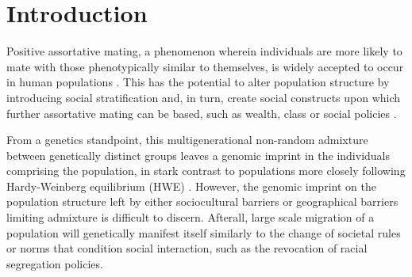 \documentclass[11pt]{article}
\begin{document}
\newpage
\tableofcontents
\thispagestyle{empty}

\newpage
\linenumbers


\setcounter{page}{3}
\section{Introduction}





Positive assortative mating, a phenomenon wherein individuals are more likely to mate with those phenotypically similar to themselves, is widely accepted to occur in human populations \parencite{Norris2019}. This has the potential to alter population structure by introducing social stratification and, in turn, create social constructs upon which further assortative mating can be based, such as wealth, class or social policies \parencite{Risch2009}.

From a genetics standpoint, this multigenerational non-random admixture between genetically distinct groups leaves a genomic imprint in the individuals comprising the population, in stark contrast to populations more closely following Hardy-Weinberg equilibrium (HWE) \parencite{Zaitlen2017}. However, the genomic imprint on the population structure left by either sociocultural barriers or geographical barriers limiting admixture is difficult to discern. Afterall, large scale migration of a population will genetically manifest itself similarly to the change of societal rules or norms that condition social interaction, such as the revocation of racial segregation policies. 
\end{document}
